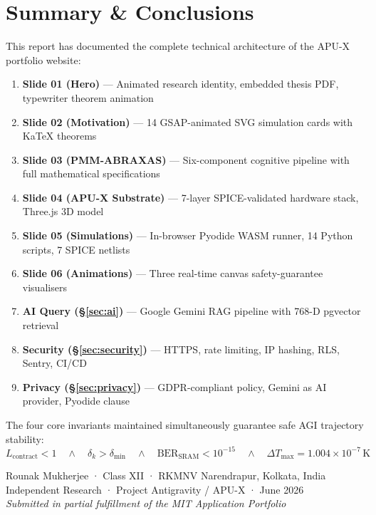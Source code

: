 \documentclass[12pt, a4paper]{article}
\begin{document}
\section{Summary \& Conclusions}
\label{sec:conclusion}

This report has documented the complete technical architecture of the APU-X
portfolio website:

\begin{enumerate}
  \item \textbf{Slide 01 (Hero)} — Animated research identity, embedded thesis PDF, typewriter theorem animation
  \item \textbf{Slide 02 (Motivation)} — 14 GSAP-animated SVG simulation cards with KaTeX theorems
  \item \textbf{Slide 03 (PMM-ABRAXAS)} — Six-component cognitive pipeline with full mathematical specifications
  \item \textbf{Slide 04 (APU-X Substrate)} — 7-layer SPICE-validated hardware stack, Three.js 3D model
  \item \textbf{Slide 05 (Simulations)} — In-browser Pyodide WASM runner, 14 Python scripts, 7 SPICE netlists
  \item \textbf{Slide 06 (Animations)} — Three real-time canvas safety-guarantee visualisers
  \item \textbf{AI Query (§\ref{sec:ai})} — Google Gemini RAG pipeline with 768-D pgvector retrieval
  \item \textbf{Security (§\ref{sec:security})} — HTTPS, rate limiting, IP hashing, RLS, Sentry, CI/CD
  \item \textbf{Privacy (§\ref{sec:privacy})} — GDPR-compliant policy, Gemini as AI provider, Pyodide clause
\end{enumerate}

The four core invariants maintained simultaneously guarantee safe AGI trajectory stability:
$$
L_{\text{contract}} < 1 \quad\wedge\quad \delta_k > \delta_{\min}
\quad\wedge\quad \text{BER}_{\text{SRAM}} < 10^{-15}
\quad\wedge\quad \Delta T_{\max} = 1.004 \times 10^{-7}\,\text{K}
$$

\vspace{1cm}

\begin{center}
  \vspace{0.5cm}

  {\small\color{gray}
  Rounak Mukherjee · Class XII · RKMNV Narendrapur, Kolkata, India\\
  Independent Research · Project Antigravity / APU-X · June 2026\\
  \textit{Submitted in partial fulfillment of the MIT Application Portfolio}
  }
\end{center}
\end{document}
